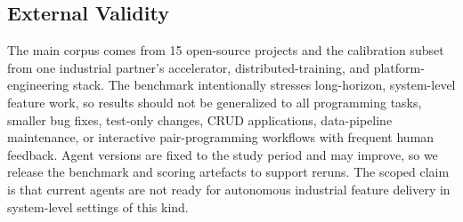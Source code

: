 \subsection{External Validity}

The main corpus comes from 15 open-source projects and the calibration subset from one industrial partner's accelerator, distributed-training, and platform-engineering stack. The benchmark intentionally stresses long-horizon, system-level feature work, so results should not be generalized to all programming tasks, smaller bug fixes, test-only changes, CRUD applications, data-pipeline maintenance, or interactive pair-programming workflows with frequent human feedback. Agent versions are fixed to the study period and may improve, so we release the benchmark and scoring artefacts to support reruns. The scoped claim is that current agents are not ready for autonomous industrial feature delivery in system-level settings of this kind.
